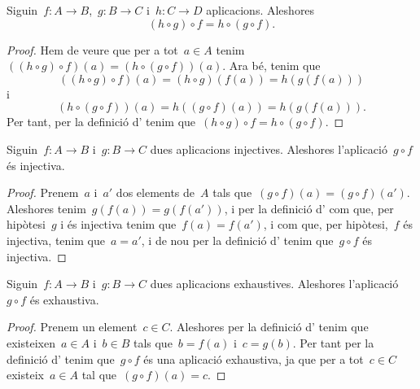 \documentclass[../../main.tex]{subfiles}
\begin{document}
    \begin{proposition}
        \label{prop:associativitat de la conjugació de funcions}
        Siguin~\(f\colon A\rightarrow B\),~\(g\colon B\rightarrow C\) i~\(h\colon C\rightarrow D\) aplicacions.
        Aleshores
        \[
            (h\circ g)\circ f=h\circ(g\circ f).
        \]
        \begin{proof}
            Hem de veure que per a tot~\(a\in A\) tenim~\(((h\circ g)\circ f)(a)=(h\circ(g\circ f))(a)\).
            Ara bé, tenim que
            \[
                ((h\circ g)\circ f)(a)=(h\circ g)(f(a))=h(g(f(a)))
            \]
            i
            \[
                (h\circ(g\circ f))(a)=h((g\circ f)(a))=h(g(f(a))).
            \]
            Per tant, per la definició d' tenim que~\((h\circ g)\circ f=h\circ(g\circ f)\).
        \end{proof}
    \end{proposition}
    \begin{theorem}
        \label{thm:composició d'injectives injectiva}
        Siguin~\(f\colon A\rightarrow B\) i~\(g\colon B\rightarrow C\) dues aplicacions injectives.
        Aleshores l'aplicació~\(g\circ f\) és injectiva.
        \begin{proof}
            Prenem~\(a\) i~\(a'\) dos elements de~\(A\) tals que~\((g\circ f)(a)=(g\circ f)(a')\).
            Aleshores tenim~\(g(f(a))=g(f(a'))\), i per la definició d' com que, per hipòtesi~\(g\) i és injectiva tenim que~\(f(a)=f(a')\), i com que, per hipòtesi,~\(f\) és injectiva, tenim que~\(a=a'\), i de nou per la definició d' tenim que~\(g\circ f\) és injectiva.
        \end{proof}
    \end{theorem}
    \begin{theorem}
        \label{thm:composició d'exhaustives exhaustiva}
        Siguin~\(f\colon A\rightarrow B\) i~\(g\colon B\rightarrow C\) dues aplicacions exhaustives.
        Aleshores l'aplicació~\(g\circ f\) és exhaustiva.
        \begin{proof}
            Prenem un element~\(c\in C\).
            Aleshores per la definició d' tenim que existeixen~\(a\in A\) i~\(b\in B\) tals que~\(b=f(a)\) i~\(c=g(b)\).
            Per tant per la definició d' tenim que~\(g\circ f\) és una aplicació exhaustiva, ja que per a tot~\(c\in C\) existeix~\(a\in A\) tal que~\((g\circ f)(a)=c\).
        \end{proof}
    \end{theorem}
\end{document}
